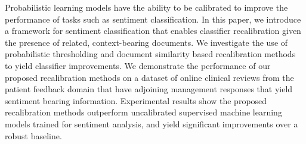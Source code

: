 Probabilistic learning models have the ability to be calibrated to improve the performance of tasks such as sentiment classification. In this paper, we introduce a framework for sentiment classification that enables classifier recalibration given the presence of related, context-bearing documents. We investigate the use of probabilistic thresholding and document similarity based recalibration methods to yield classifier improvements. We demonstrate the performance of our proposed recalibration methods on a dataset of online clinical reviews from the patient feedback domain that have adjoining management responses that yield sentiment bearing information. Experimental results show  the proposed recalibration methods outperform uncalibrated supervised machine learning models trained for sentiment analysis, and yield significant improvements over a robust baseline.
